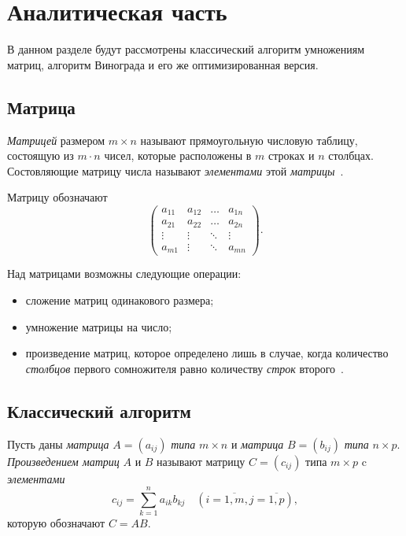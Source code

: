 \chapter{Аналитическая часть}
В данном разделе будут рассмотрены классический алгоритм умножениям матриц, алгоритм Винограда и его же оптимизированная версия.

\section{Матрица}
\textit{Матрицей} размером $m \times n$ называют прямоугольную числовую таблицу, состоящую из $m \cdot n$ чисел, которые расположены в $m$ строках и $n$ столбцах.
Состовляющие матрицу числа называют \textit{элементами} этой \textit{матрицы}~\cite{matrix}.

Матрицу обозначают
\begin{equation}
    \begin{pmatrix}
        a_{11} & a_{12} & \ldots & a_{1n}\\
		a_{21} & a_{22} & \ldots & a_{2n}\\
		\vdots & \vdots & \ddots & \vdots\\
        a_{m1} & \vdots & \ddots & a_{mn}
        \end{pmatrix}.
\end{equation}

Над матрицами возможны следующие операции:
\begin{itemize}
    \item сложение матриц одинакового размера;
    \item умножение матрицы на число;
    \item произведение матриц, которое определено лишь в случае, когда количество \textit{столбцов} первого сомножителя равно количеству \textit{строк} второго~\cite{matrix}.
\end{itemize}

\section{Классический алгоритм}
Пусть даны \textit{матрица} $A = (a_{ij})$ \textit{типа} $m \times n$ и \textit{матрица} $B = (b_{ij})$ \textit{типа} $n \times p$.
\textit{Произведением матриц} $A$ и $B$ называют матрицу $C = (c_{ij})$ типа $m \times p$ c \textit{элементами}
\begin{equation}
    \label{eq:classic_1}
    c_{ij} = \sum_{k=1}^{n}a_{ik}b_{kj} \quad (i = \overline{1, m}, j = \overline{1, p}),
\end{equation}
которую обозначают $C = AB$.

